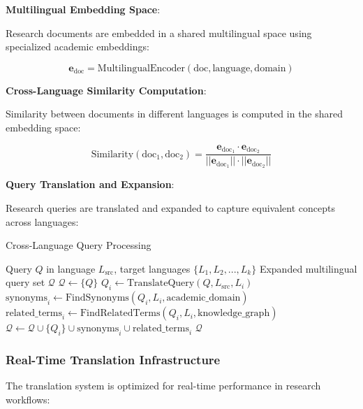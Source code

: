 \documentclass[10pt,twocolumn]{article}
\begin{document}
\textbf{Multilingual Embedding Space}:

Research documents are embedded in a shared multilingual space using specialized academic embeddings:

\begin{equation}
\mathbf{e}_{\text{doc}} = \text{MultilingualEncoder}(\text{doc}, \text{language}, \text{domain})
\end{equation}

\textbf{Cross-Language Similarity Computation}:

Similarity between documents in different languages is computed in the shared embedding space:

\begin{equation}
\text{Similarity}(\text{doc}_1, \text{doc}_2) = \frac{\mathbf{e}_{\text{doc}_1} \cdot \mathbf{e}_{\text{doc}_2}}{||\mathbf{e}_{\text{doc}_1}|| \cdot ||\mathbf{e}_{\text{doc}_2}||}
\end{equation}

\textbf{Query Translation and Expansion}:

Research queries are translated and expanded to capture equivalent concepts across languages:

\begin{algorithm}[H]
\caption{Cross-Language Query Processing}
\label{alg:cross_lang_query}
\begin{algorithmic}[1]
\REQUIRE Query $Q$ in language $L_{\text{src}}$, target languages $\{L_1, L_2, ..., L_k\}$
\ENSURE Expanded multilingual query set $\mathcal{Q}$
\STATE $\mathcal{Q} \leftarrow \{Q\}$
    \STATE $Q_i \leftarrow \text{TranslateQuery}(Q, L_{\text{src}}, L_i)$
    \STATE $\text{synonyms}_i \leftarrow \text{FindSynonyms}(Q_i, L_i, \text{academic\_domain})$
    \STATE $\text{related\_terms}_i \leftarrow \text{FindRelatedTerms}(Q_i, L_i, \text{knowledge\_graph})$
    \STATE $\mathcal{Q} \leftarrow \mathcal{Q} \cup \{Q_i\} \cup \text{synonyms}_i \cup \text{related\_terms}_i$
\ENDFOR
\RETURN $\mathcal{Q}$
\end{algorithmic}
\end{algorithm}

\subsubsection{Real-Time Translation Infrastructure}

The translation system is optimized for real-time performance in research workflows:
\end{document}
